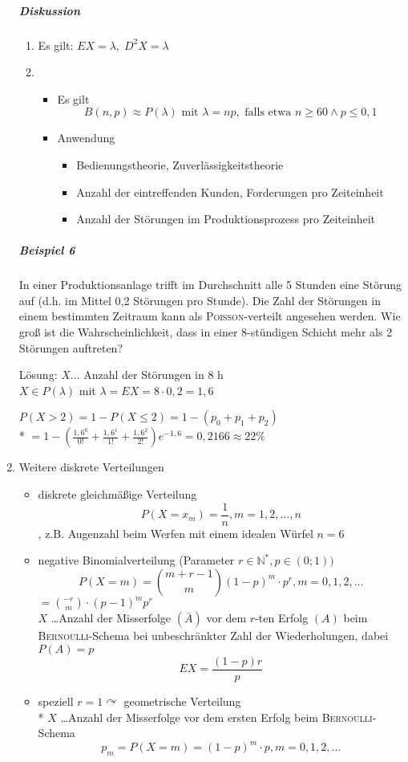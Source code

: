 \documentclass[a4paper]{scrartcl}
\begin{document}
\begin{enumerate}
\subparagraph{Diskussion}
    \begin{enumerate}
    \item Es gilt: $EX = \lambda, \; D^2X= \lambda$
    \item 
        \begin{itemize}
        \item Es gilt
        \[ B (n,p) \approx P(\lambda) \text{ mit } \lambda = np, \text{ falls etwa } n \geq 60 \wedge p \leq 0,1 \]
        \item Anwendung
            \begin{itemize}
            \item Bedienungstheorie, Zuverlässigkeitstheorie
            \item Anzahl der eintreffenden Kunden, Forderungen pro Zeiteinheit
            \item Anzahl der Störungen im Produktionsprozess pro Zeiteinheit
            \end{itemize}
        \end{itemize}
    \end{enumerate}

\subparagraph{Beispiel 6} In einer Produktionsanlage trifft im Durchschnitt alle 5 Stunden eine Störung auf (d.h. im Mittel 0,2 Störungen pro Stunde). Die Zahl der Störungen in einem bestimmten Zeitraum kann als \textsc{Poisson}-verteilt angesehen werden. Wie groß ist die Wahrscheinlichkeit, dass in einer 8-stündigen Schicht mehr als 2 Störungen auftreten?

Lösung: $X \dots$ Anzahl der Störungen in 8 h\\
$X \in P(\lambda)$ mit $\lambda = EX= 8 \cdot 0,2 = 1,6$

$P(X>2) = 1- P(X \leq 2) = 1 - (p_0 + p_1 + p_2)$\\*
$=1-(\frac{1,6^0}{0!} + \frac{1,6^1}{1!} + \frac{1,6^2}{2!} ) e^{-1,6} = 0,2166 \approx 22 \%$

\item Weitere diskrete Verteilungen
    \begin{itemize}
    \item diskrete gleichmäßige Verteilung \[P(X = x_m) = \frac{1}{n}, m =1,2, \dots,n\], z.B. Augenzahl beim Werfen mit einem idealen Würfel $n=6$
    \item negative Binomialverteilung (Parameter $r \in \mathbb{N}^*, p \in (0;1))$
    \[ P (X=m) = \binom{m + r -1}{m} (1-p)^m \cdot p^r, m = 0,1,2,\dots \] $= \binom{-r}{m} \cdot (p-1)^m p^r$\\
    $X$ \dots Anzahl der Misserfolge $(\bar{A})$ vor dem $r$-ten Erfolg $(A)$ beim \textsc{Bernoulli}-Schema bei unbeschränkter Zahl der Wiederholungen, dabei $P(A) = p$
    \[ EX = \frac{(1-p) r}{p} \]
    \item speziell $r=1 \curvearrowright$ geometrische Verteilung\\*
    $X$ \dots Anzahl der Misserfolge vor dem ersten Erfolg beim \textsc{Bernoulli}-Schema
    \[p_m = P(X=m) = (1-p)^m \cdot p, m = 0,1,2,\dots \]
    \end{itemize}


\end{enumerate}
\end{document}
